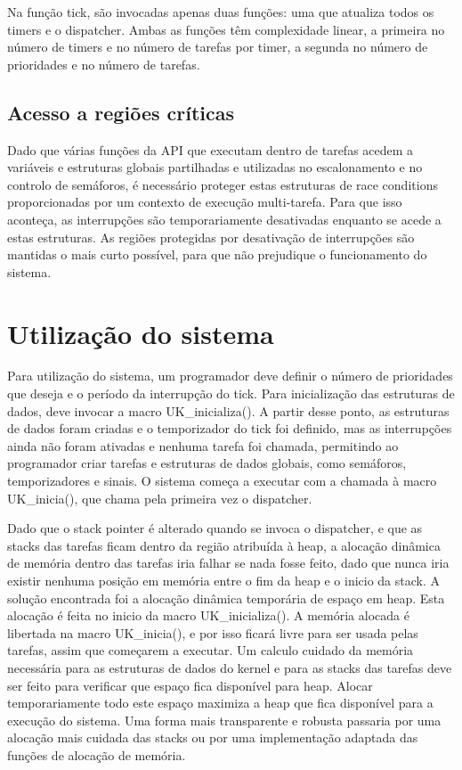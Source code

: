 \documentclass[journal]{IEEEtran}
\begin{document}
Na função tick, são invocadas apenas duas funções: uma que atualiza todos os timers e o dispatcher.
Ambas as funções têm complexidade linear, a primeira no número de timers e no número de tarefas por timer, a segunda no número de prioridades e no número de tarefas.

\subsection{Acesso a regiões críticas}
Dado que várias funções da API que executam dentro de tarefas acedem a variáveis e estruturas globais partilhadas e utilizadas no escalonamento e no controlo de semáforos,
é necessário proteger estas estruturas de race conditions proporcionadas por um contexto de execução multi-tarefa.
Para que isso aconteça, as interrupções são temporariamente desativadas enquanto se acede a estas estruturas.
As regiões protegidas por desativação de interrupções são mantidas o mais curto possível, para que não prejudique o funcionamento do sistema.

\section{Utilização do sistema}
Para utilização do sistema, um programador deve definir o número de prioridades que deseja e o período da interrupção do tick.
Para inicialização das estruturas de dados, deve invocar a macro UK\_inicializa().
A partir desse ponto, as estruturas de dados foram criadas e o temporizador do tick foi definido, mas as interrupções ainda não foram ativadas e nenhuma tarefa foi
chamada, permitindo ao programador criar tarefas e estruturas de dados globais, como semáforos, temporizadores e sinais.
O sistema começa a executar com a chamada à macro UK\_inicia(), que chama pela primeira vez o dispatcher.

Dado que o stack pointer é alterado quando se invoca o dispatcher, e que as stacks das tarefas ficam dentro da região atribuída à heap, a alocação dinâmica de memória
dentro das tarefas iria falhar se nada fosse feito, dado que nunca iria existir nenhuma posição em memória entre o fim da heap e o inicio da stack.
A solução encontrada foi a alocação dinâmica temporária de espaço em heap.
Esta alocação é feita no inicio da macro UK\_inicializa().
A memória alocada é libertada na macro UK\_inicia(), e por isso ficará livre para ser usada pelas tarefas, assim que começarem a executar.
Um calculo cuidado da memória necessária para as estruturas de dados do kernel e para as stacks das tarefas deve ser feito para verificar que espaço fica disponível para
heap.
Alocar temporariamente todo este espaço maximiza a heap que fica disponível para a execução do sistema.
Uma forma mais transparente e robusta passaria por uma alocação mais cuidada das stacks ou por uma implementação adaptada das funções de alocação de memória.
\end{document}
